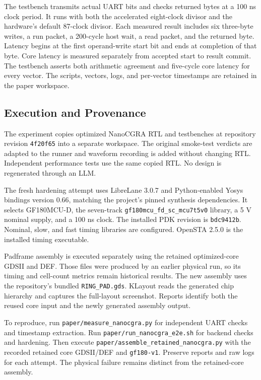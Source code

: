 \documentclass[conference,letterpaper]{IEEEtran}
\begin{document}
The testbench transmits actual UART bits and checks returned bytes at a 100 ns clock period. It runs with both the accelerated eight-clock divisor and the hardware's default 87-clock divisor. Each measured result includes six three-byte writes, a run packet, a 200-cycle host wait, a read packet, and the returned byte. Latency begins at the first operand-write start bit and ends at completion of that byte. Core latency is measured separately from accepted start to result commit. The testbench asserts both arithmetic agreement and five-cycle core latency for every vector. The scripts, vectors, logs, and per-vector timestamps are retained in the paper workspace.

\subsection{Execution and Provenance}
The experiment copies optimized NanoCGRA RTL and testbenches at repository revision \texttt{4f20f65} into a separate workspace. The original smoke-test verdicts are adapted to the runner and waveform recording is added without changing RTL. Independent performance tests use the same copied RTL. No design is regenerated through an LLM.

The fresh hardening attempt uses LibreLane 3.0.7 and Python-enabled Yosys bindings version 0.66, matching the project's pinned synthesis dependencies. It selects GF180MCU-D, the seven-track \texttt{gf180mcu\_fd\_sc\_mcu7t5v0} library, a 5 V nominal supply, and a 100 ns clock. The installed PDK revision is \texttt{bdc9412b}. Nominal, slow, and fast timing libraries are configured. OpenSTA 2.5.0 is the installed timing executable.

Padframe assembly is executed separately using the retained optimized-core GDSII and DEF. Those files were produced by an earlier physical run, so its timing and cell-count metrics remain historical results. The new assembly uses the repository's bundled \texttt{RING\_PAD.gds}. KLayout reads the generated chip hierarchy and captures the full-layout screenshot. Reports identify both the reused core input and the newly generated assembly output.

To reproduce, run \texttt{paper/measure\_nanocgra.py} for independent UART checks and timestamp extraction. Run \texttt{paper/run\_nanocgra\_e2e.sh} for backend checks and hardening. Then execute \texttt{paper/assemble\_retained\_nanocgra.py} with the recorded retained core GDSII/DEF and \texttt{gf180-v1}. Preserve reports and raw logs for each attempt. The physical failure remains distinct from the retained-core assembly.
\end{document}
